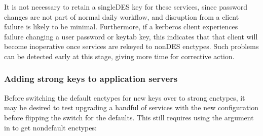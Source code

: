 \documentclass[letterpaper,10pt,english]{sphinxmanual}
\begin{document}
\sphinxAtStartPar
It is not necessary to retain a single\sphinxhyphen{}DES key for these services, since
password changes are not part of normal daily workflow, and disruption
from a client failure is likely to be minimal.  Furthermore, if a kerberos
client experiences failure changing a user password or keytab key,
this indicates that that client will become inoperative once services
are rekeyed to non\sphinxhyphen{}DES enctypes.  Such problems can be detected early
at this stage, giving more time for corrective action.


\subsubsection{Adding strong keys to application servers}
\label{\detokenize{admin/advanced/retiring-des:adding-strong-keys-to-application-servers}}
\sphinxAtStartPar
Before switching the default enctypes for new keys over to strong enctypes,
it may be desired to test upgrading a handful of services with the
new configuration before flipping the switch for the defaults.  This
still requires using the  argument in {\hyperref[\detokenize{admin/admin_commands/kadmin_local:kadmin-1}]{}} to get non\sphinxhyphen{}default
enctypes:
\end{document}
